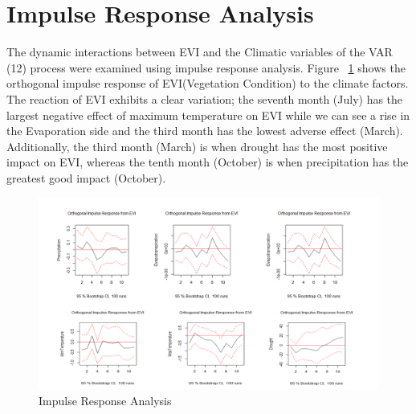 \section{Impulse Response Analysis}
The dynamic interactions between EVI and the Climatic variables of the VAR (12) process were examined using impulse response analysis. Figure ~\ref{fig:impose} shows the orthogonal impulse response of EVI(Vegetation Condition) to the climate factors. The reaction of EVI exhibits a clear variation; the seventh month (July) has the largest negative effect of maximum temperature on EVI while we can see a rise in the Evaporation side and the third month has the lowest adverse effect (March). Additionally, the third month (March) is when drought has the most positive impact on EVI, whereas the tenth month (October) is when precipitation has the greatest good impact (October).
\begin{figure}
	\centering
	\includegraphics[width=1\linewidth]{images/impose}
	\caption{Impulse Response Analysis}
	\label{fig:impose}
\end{figure}
